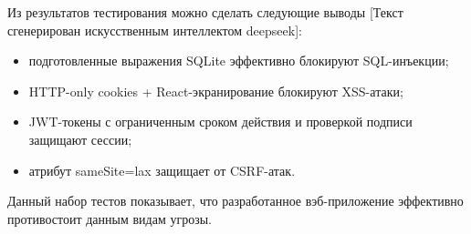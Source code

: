 Из результатов тестирования можно сделать следующие выводы [Текст сгенерирован искусственным интеллектом deepseek]:
\begin{itemize}
\item подготовленные выражения SQLite эффективно блокируют SQL-инъекции;
\item HTTP-only cookies + React-экранирование блокируют XSS-атаки;
\item JWT-токены с ограниченным сроком действия и проверкой подписи защищают сессии;
\item атрибут sameSite=lax защищает от CSRF-атак.
\end{itemize}

Данный набор тестов показывает, что разработанное вэб-приложение эффективно противостоит данным видам угрозы.
